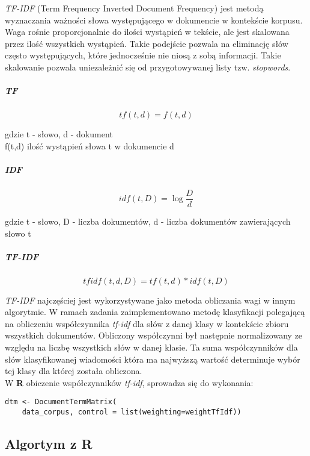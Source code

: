 \documentclass[a4paper,12pt]{article}
\begin{document}
\textit{TF-IDF} (Term Frequency Inverted Document Frequency) jest metodą wyznaczania ważności słowa występującego w dokumencie w kontekście korpusu. Waga rośnie proporcjonalnie do ilości wystąpień w tekście, ale jest skalowana przez ilość wszystkich wystąpień. Takie podejście pozwala na eliminację słów często występujących, które jednocześnie nie niosą z sobą informacji. Takie skalowanie pozwala uniezależnić się od przygotowywanej listy tzw. \textit{stopwords}.

\subparagraph{TF}
\begin{equation}
  tf(t,d)=f(t,d)  
\end{equation}


gdzie t - słowo, d - dokument\\

f(t,d) ilość wystąpień słowa t w dokumencie d

\subparagraph{IDF}
\begin{equation}
idf(t,D)=\log \frac{D}{d}
\end{equation}

gdzie t - słowo, D - liczba dokumentów, d - liczba dokumentów zawierających słowo t

\subparagraph{TF-IDF}
  
\begin{equation}
tfidf(t,d,D)=tf(t,d)*idf(t,D)
\end{equation}

\textit{TF-IDF} najczęściej jest wykorzystywane jako metoda obliczania wagi w innym algorytmie. W ramach zadania zaimplementowano metodę klasyfikacji polegającą na obliczeniu współczynnika \textit{tf-idf} dla słów z danej klasy w kontekście zbioru wszystkich dokumentów. Obliczony współczynni był następnie normalizowany ze względu na liczbę wszystkich słów w danej klasie. Ta suma współczynników dla słów klasyfikowanej wiadomości która ma najwyższą wartość determinuje wybór tej klasy dla której została obliczona.\\

W \textbf{R} obiczenie współczynników \textit{tf-idf}, sprowadza się do wykonania:

\begin{lstlisting}[]
dtm <- DocumentTermMatrix(
	data_corpus, control = list(weighting=weightTfIdf))
\end{lstlisting}

\subsection{Algortym z R}
\end{document}

